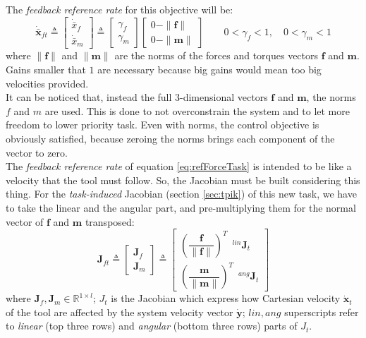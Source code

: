 \noindent The \textit{feedback reference rate} for this objective will be:
\begin{equation}
	\label{eq:refForceTask}
	\boldsymbol{\dot{\bar{x}}}_{ft} \triangleq \begin{bmatrix}{\dot{\bar{x}}}_f \\ {\dot{\bar{x}}}_m \end{bmatrix} \triangleq 
	\begin{bmatrix} \gamma_f \\ \gamma_m \end{bmatrix} 
	\begin{bmatrix}
		0 - \| \boldsymbol{f} \| \\ 0 -\| \boldsymbol{m} \|
	\end{bmatrix} \qquad 0 < \gamma_f < 1, \quad 0 < \gamma_m < 1
\end{equation}
where $\| \boldsymbol{f} \|$ and $\| \boldsymbol{m} \|$ are the norms of the forces and torques vectors $\boldsymbol{f}$ and $\boldsymbol{m}$. Gains smaller that $1$ are necessary because big gains would mean too big velocities provided.\\
It can be noticed that, instead the full 3-dimensional vectors $\boldsymbol{f}$ and $\boldsymbol{m}$, the norms $f$ and $m$ are used. This is done to not overconstrain the system and to let more freedom to lower priority task. Even with norms, the control objective is obviously satisfied, because zeroing the norms brings each component of the vector to zero.\\

The \textit{feedback reference rate} of equation \eqref{eq:refForceTask} is intended to be like a velocity that the tool must follow. So, the Jacobian must be built considering this thing. For the \textit{task-induced} Jacobian (section \ref{sec:tpik}) of this new task, we have to take the linear and the angular part, and pre-multiplying them for the normal vector of $\boldsymbol{f}$ and $\boldsymbol{m}$ transposed:
\begin{equation}
	\boldsymbol{J}_{ft} \triangleq \begin{bmatrix}{\boldsymbol{J}}_f \\[1em] {\boldsymbol{J}}_m \end{bmatrix} \triangleq 
	\begin{bmatrix} \left( \dfrac{\boldsymbol{f}}{\| \boldsymbol{f} \|}\right)^T \enspace ^{lin}\boldsymbol{J}_t  \\[1.5em]
		\left( \dfrac{\boldsymbol{m}}{\| \boldsymbol{m} \|}\right) ^T \enspace ^{ang}\boldsymbol{J}_t  \end{bmatrix} 
\end{equation}
where $\boldsymbol{J}_f, \boldsymbol{J}_m \in \mathbb{R}^{1\times l}$; $J_t$ is the Jacobian which express how Cartesian velocity $\dot{\boldsymbol{x}}_t$ of the tool are affected by the system velocity vector  $\dot{\boldsymbol{y}}$; $lin, ang$ superscripts refer to \textit{linear} (top three rows) and \textit{angular} (bottom three rows) parts of $J_t$.\\


